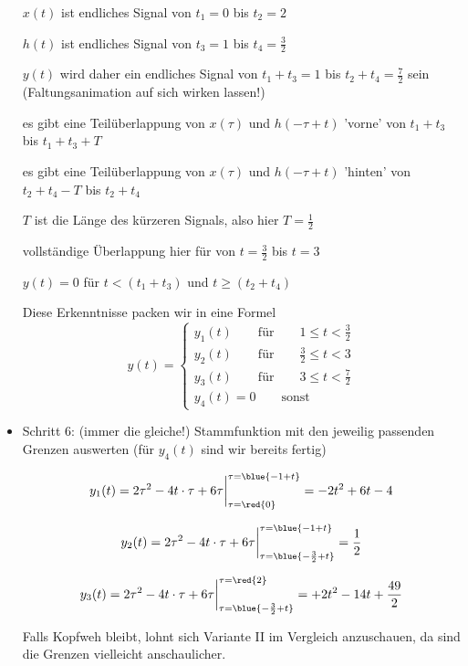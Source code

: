 \begin{ExCalc}
\begin{itemize}
  $x(t)$ ist endliches Signal von $t_1=0$ bis $t_2=2$

  $h(t)$ ist endliches Signal von $t_3=1$ bis $t_4=\frac{3}{2}$

  $y(t)$ wird daher ein endliches Signal von $t_1+t_3=1$ bis $t_2+t_4=\frac{7}{2}$ sein
  (Faltungsanimation auf sich wirken lassen!)

  es gibt eine Teilüberlappung von $x(\tau)$ und $h(-\tau+t)$  'vorne' von
  $t_1+t_3$ bis $t_1+t_3+T$

  es gibt eine Teilüberlappung von $x(\tau)$ und $h(-\tau+t)$  'hinten' von
  $t_2+t_4-T$ bis $t_2+t_4$

  $T$ ist die Länge des kürzeren Signals, also hier $T=\frac{1}{2}$

  vollständige Überlappung hier für von $t = \frac{3}{2}$ bis $t=3$

  $y(t)=0$ für $t<(t_1+t_3)$ und $t\geq(t_2+t_4)$

  Diese Erkenntnisse packen wir in eine Formel
  \begin{equation}
  y(t) =
  \begin{cases}
    y_1(t) \qquad \mathrm{für} \qquad 1 \leq t < \frac{3}{2}\\
    y_2(t) \qquad \mathrm{für} \qquad \frac{3}{2} \leq t < 3\\
    y_3(t) \qquad \mathrm{für} \qquad 3 \leq t < \frac{7}{2}\\
    y_4(t)=0 \qquad \mathrm{sonst}
  \end{cases}
  \end{equation}

  \item Schritt 6:  (immer die gleiche!)
  Stammfunktion mit den jeweilig passenden Grenzen auswerten (für $y_4(t)$ sind wir bereits fertig)

  \begin{equation}
  y_1(t) = 2 \tau^2 - 4 t \cdot \tau + 6 \tau\bigg|_{\tau=\red{0}}^{\tau=\blue{-1+t}}
  = -2 t^2 + 6 t - 4
  \end{equation}

  \begin{equation}
  y_2(t) = 2 \tau^2 - 4 t \cdot \tau + 6 \tau\bigg|_{\tau=\blue{-\frac{3}{2}+t}}^{\tau=\blue{-1+t}}  = \frac{1}{2}
  \end{equation}

  \begin{equation}
  y_3(t) = 2 \tau^2 - 4 t \cdot \tau + 6 \tau\bigg|_{\tau=\blue{-\frac{3}{2}+t}}^{\tau=\red{2}} = +2 t^2 - 14 t + \frac{49}{2}
  \end{equation}

  Falls Kopfweh bleibt, lohnt sich Variante II im Vergleich anzuschauen, da
  sind die Grenzen vielleicht anschaulicher.

\end{itemize}
\end{ExCalc}



